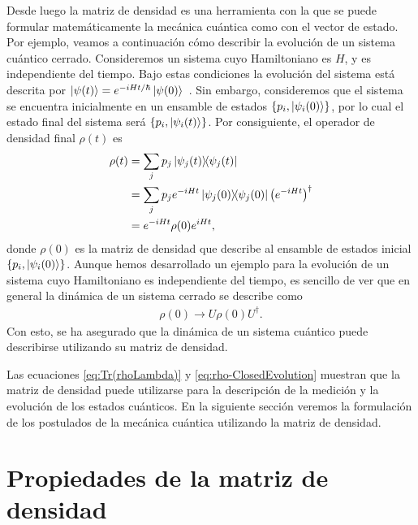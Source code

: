 Desde luego la matriz de densidad es una herramienta con la que
se puede formular matemáticamente la mecánica cuántica como 
con el vector de estado. Por ejemplo, veamos a continuación cómo 
describir la evolución de un sistema cuántico cerrado.
Consideremos un sistema cuyo Hamiltoniano es $H$, y es
independiente del tiempo. Bajo estas condiciones la evolución
del sistema está descrita por 
$\ket{\psi (t)}=e^{-iHt/\hbar}\ket{\psi(0)}$~\cite{sakurai2010modern}. 
Sin embargo, consideremos que el sistema se encuentra inicialmente
en un ensamble de estados $\{p_i, \ket{\psi_i(0)}\}$, por lo cual
el estado final del sistema será 
$\{p_i, \ket{\psi_i(t)}\}$.
Por consiguiente, el operador de densidad final $\rho(t)$  es 
\begin{align} \label{eq:Rho-evolution-H}
	\rho(t) &= \sum_j p_j\dyad{\psi_j(t)}{\psi_j(t)}\nonumber\\
	&= \sum_j p_j e^{-iHt} \dyad{\psi_j(0)}{\psi_j(0)}\qty(e^{-iHt})^{\dagger}
	\nonumber\\
	&= e^{-iHt}\rho(0)e^{iHt},
\end{align}
donde $\rho(0)$ es la matriz de densidad que describe al ensamble 
de estados inicial $\{p_i, \ket{\psi_i(0)}\}$.	 Aunque hemos desarrollado 
un ejemplo para la evolución de un sistema cuyo Hamiltoniano es 
independiente del tiempo, es sencillo de ver que en general la dinámica  
de un sistema cerrado se describe como 
\begin{align}\label{eq:rho-ClosedEvolution}
\rho(0) \longrightarrow U\rho(0)U^{\dagger}.
\end{align}
Con esto, se ha asegurado que la dinámica de un sistema cuántico puede 
describirse utilizando su matriz de densidad.

Las ecuaciones \eqref{eq:Tr(rhoLambda)} y \eqref{eq:rho-ClosedEvolution}
muestran que la matriz de densidad puede utilizarse para la descripción 
de la medición y la evolución de los estados cuánticos. 
En la siguiente sección veremos la formulación de los postulados 
de la mecánica cuántica utilizando la matriz de densidad.

\section{Propiedades de la matriz de densidad} %
\label{sec:density-matrices-properties}




